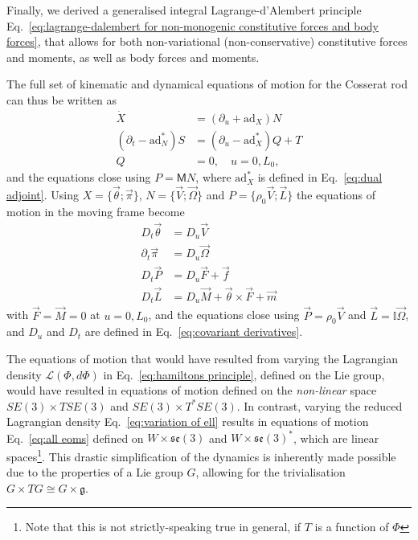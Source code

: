 Finally, we derived a generalised integral Lagrange-d'Alembert principle Eq.~\ref{eq:lagrange-dalembert for non-monogenic constitutive forces and body forces}, that allows for both non-variational (non-conservative) constitutive forces and moments, as well as body forces and moments.

The full set of kinematic and dynamical equations of motion for the Cosserat rod can thus be written as
\begin{subequations} \label{eq:all eoms}
\begin{align}
\dot{X} & = (\partial_u + \text{ad}_X) N \\
\left(\partial_t - \text{ad}_N^* \right) S & = \left(\partial_u - \text{ad}_X^* \right) Q + T \\
Q & = 0, \quad u = 0, L_0, 
\end{align}
\end{subequations}
and the equations close using $P = \mathsf{M} N$, where $\text{ad}_X^*$ is defined in Eq.~\ref{eq:dual adjoint}. Using $X = \{ \vec{\theta} ; \vec{\pi} \}$, $N = \{ \vec{V} ; \vec{\Omega} \}$ and $P = \{ \rho_0 \vec{V} ; \vec{L} \}$ the equations of motion in the moving frame become
\begin{subequations} 
\begin{align}
D_t \vec{\theta} & = D_u \vec{V} \\
\partial_t \vec{\pi} & = D_u \vec{\Omega} \\
D_t \vec{P} & = D_u \vec{F} + \vec{f} \\
D_t \vec{L} & = D_u \vec{M} + \vec{\theta} \times \vec{F} + \vec{m} 
\end{align}
\end{subequations}
with $\vec{F} = \vec{M} = 0$ at $u = 0, L_0$, and the equations close using $\vec{P} = \rho_0 \vec{V}$ and $\vec{L} = \mathbb{I} \vec{\Omega}$, and $D_u$ and $D_t$ are defined in Eq.~\ref{eq:covariant derivatives}.

The equations of motion that would have resulted from varying the Lagrangian density $\mathcal{L}(\Phi, d \Phi)$ in Eq.~\ref{eq:hamiltons principle}, defined on the Lie group, would have resulted in equations of motion defined on the \textit{non-linear} space $SE(3) \times TSE(3)$ and $SE(3) \times T^*SE(3)$. In contrast, varying the reduced Lagrangian density Eq.~\ref{eq:variation of ell} results in equations of motion Eq.~\ref{eq:all eoms} defined on $W \times \mathfrak{se}(3)$ and $W \times \mathfrak{se}(3)^*$, which are linear spaces\footnote{Note that this is not strictly-speaking true in general, if $T$ is a function of $\Phi$}. This drastic simplification of the dynamics is inherently made possible due to the properties of a Lie group $G$, allowing for the trivialisation $G \times TG \cong G \times \mathfrak{g}$.

